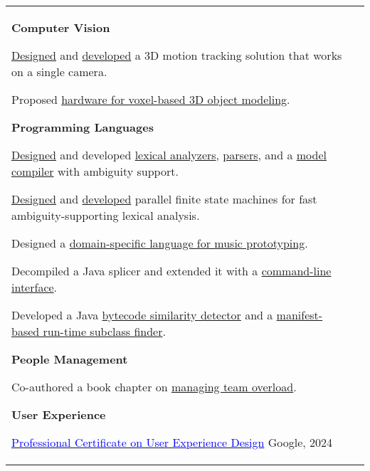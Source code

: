 \documentclass[letterpaper,10pt,oneside]{article}
\newcommand{\DatestampY}[1]{#1}
\newcommand{\itemspacingtwo}{\vspace{0.08cm}}
\newcommand{\sref}[2]{%
    \href{https://0/local/attachments/#1}{\textcolor{blue}{#2}}%
}
\newenvironment{body}
{\par\par
\begin{longtable}{p{0.145\textwidth}p{0.81\textwidth}}}
{\par\end{longtable}\par}
\begin{document}
\begin{body}
\textbf{Computer Vision}
\begin{comp}
\item \href{https://www.worldscientific.com/doi/abs/10.1142/S0129065712500190}{Designed} and \href{https://github.com/lquesada/MotionTracking}{developed} a 3D motion tracking solution that works on a single camera.
\item Proposed \href{https://www.tdcommons.org/dpubs_series/4167/}{hardware for voxel-based 3D object modeling}.
\end{comp}
\itemspacingtwo

\textbf{Programming Languages}
\begin{comp}
\item \href{https://www.worldscientific.com/doi/abs/10.1142/S0218194014500375}{Designed} and developed \href{https://github.com/lquesada/ModelCC/tree/master/ModelCC/src/org/modelcc/lexer}{lexical analyzers}, \href{https://github.com/lquesada/ModelCC/tree/master/ModelCC/src/org/modelcc/parser}{parsers}, and a \href{https://github.com/lquesada/ModelCC}{model compiler} with ambiguity support.
\item \href{https://www.scitepress.org/Link.aspx?doi=10.5220/0003949901050110}{Designed} and \href{https://github.com/lquesada/PFSMs-Java}{developed} parallel finite state machines for fast ambiguity-supporting lexical analysis.
\item Designed a \href{https://github.com/lquesada/ADAgio}{domain-specific language for music prototyping}.
\item Decompiled a Java splicer and extended it with a \href{https://github.com/lquesada/JarSplicePlus}{command-line interface}.
\item Developed a Java \href{https://github.com/lquesada/JSimil}{bytecode similarity detector} and a \href{https://github.com/lquesada/RunTimeSubclassFinder}{manifest-based run-time subclass finder}.
\end{comp}
\itemspacingtwo

\textbf{People Management}
\begin{comp}
\item Co-authored a book chapter on \href{https://landing.google.com/sre/workbook/chapters/overload/}{managing team overload}.
\end{comp}
\itemspacingtwo

\textbf{User Experience}
\begin{comp}
\item \sref{Certificate-Coursera-Google-UX-Design.pdf}{Professional Certificate on User Experience Design} \textemdash{ }Google, \DatestampY{2024}
\end{comp}
\itemspacingtwo


\end{body}
\end{document}
